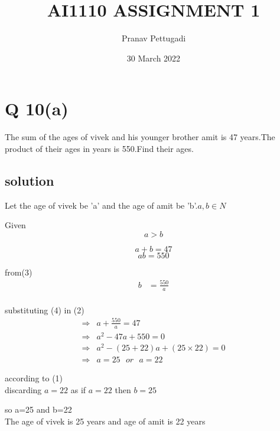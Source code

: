 \documentclass[15PT]{article}
\begin{document}
\title{AI1110 ASSIGNMENT 1}
\author{Pranav Pettugadi}
\date{30 March 2022}
\maketitle

\section*{Q 10(a)}
  The sum of the ages of vivek and his younger brother amit is 47 years.The product of their ages in years is 550.Find their ages.
  \begin{multicols*}{2}
  
  \section*{solution}
  Let the age of vivek be 'a' and the age of amit be 'b'.$ a,b \in N$
  
  Given
  \begin{equation}
  a>b 
  \end{equation}
  
    
  \begin{equation}
            a+b=47
 \end{equation}
 \begin{equation}
     ab=550
 \end{equation}
 
 from(3)
 \begin{align*}
 b&=\frac{550}{a}\\
 \end{align*}
 
 substituting (4) in (2)
 \begin{align*}
    \Rightarrow & a+\frac{550}{a}=47\\
    \Rightarrow & a^2-47a+550=0\\
    \Rightarrow & a^2-(25+22)a+(25\times22)=0\\
    \Rightarrow & a=25 \hspace{8pt}or\hspace{8pt} a=22
\end{align*}
\begin{center}
    

  \hspace{15pt} according to (1)\\
   \hspace{8pt}discarding $a=22$ as if $a=22 $ then $b=25$ \\
\end{center}
 
 \hspace{15pt} so a=25 and b=22 \\
The age of vivek is 25 years and age of amit is 22 years
\end{multicols*}
 
\end{document}
